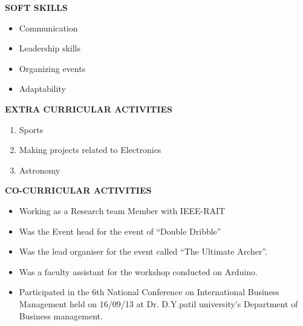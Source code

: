 \documentclass[a4paper]{article}
\begin{document}
\begin{flushleft}
\textbf {SOFT SKILLS}\\
\begin{itemize}
\item Communication
\item Leadership skills
\item Organizing events
\item Adaptability
\end{itemize}
\end{flushleft}

\begin{flushleft}
\textbf {EXTRA CURRICULAR ACTIVITIES}\\
\begin{enumerate}
\item Sports
\item Making projects related to Electronics
\item Astronomy
\end{enumerate}
\end{flushleft}


\begin{flushleft}
\vspace{2in}
\textbf {CO-CURRICULAR ACTIVITIES}\\
\begin{itemize}
\item Working as a Research team Member with IEEE-RAIT
\item 	Was the Event head for the event of  “Double Dribble”
\item 	Was the lead organiser for the event called “The Ultimate Archer”.
\item 	Was a  faculty assistant for the workshop conducted on Arduino.
\item 	Participated in the 6th National Conference on International Business Management held on 16/09/13 at Dr. D.Y.patil university’s Department of Business management.
\end{itemize}
\end{flushleft}
\end{document}
